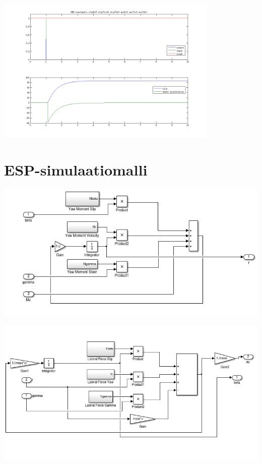 \documentclass{article}
\newcommand{\kuvaa}[4]{%
	\begin{figure}[h]%
		\centering \texttt{[image: \#2]}%
		\caption{#3 \label{fig:#4}}%
	\end{figure}%
}
\begin{document}
\begin{appendices}
{ \includegraphics[width=0.8\textwidth]{abssim3}}

\section{ESP-simulaatiomalli} \label{app:espmodel}
{\centering \includegraphics[width=1.0\textwidth]{espmdl1}

 \includegraphics[width=1.0\textwidth]{espmdl2}}


\end{appendices}
\end{document}
